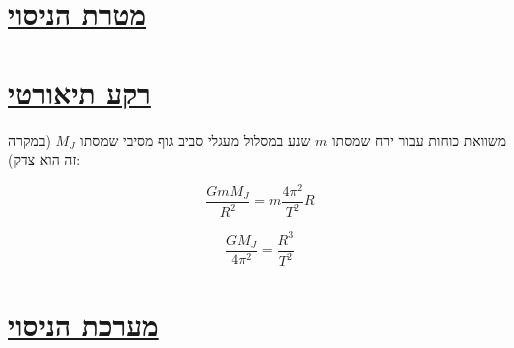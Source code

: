 \documentclass[a4paper, 12pt]{article}
\begin{document}
    {\makeatletter
        \def\@@underline#1{#1}
        \tableofcontents
    \makeatother} %

    \pagebreak 

    \section{\underline{מטרת הניסוי}}
    \begin{spacing}{1.15}
        \begin{flushright}

        \end{flushright}
    \end{spacing}


    \begin{figure}[h!]
        
    \end{figure}

    \pagebreak 

    \section{\underline{רקע תיאורטי}}
    \begin{spacing}{1.15}
        \begin{flushright}
            משוואת כוחות עבור ירח שמסתו $m$ שנע במסלול מעגלי סביב גוף מסיבי שמסתו $M_J$ (במקרה זה הוא צדק):
        \end{flushright}
    \end{spacing}

    $$ \frac{GmM_J}{R^2} = m\frac{4\pi^2}{T^2}R $$

    $$ \frac{GM_J}{4\pi^2} = \frac{R^3}{T^2} $$

    \pagebreak 

    \section{\underline{מערכת הניסוי}}
    \begin{spacing}{1.15}
        \begin{flushright}

        \end{flushright}
    \end{spacing}

    \pagebreak 
\end{document}
